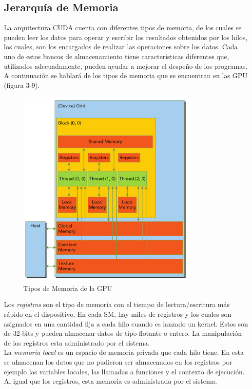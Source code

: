 \subsection{Jerarquía de Memoria}
La arquitectura CUDA cuenta con diferentes tipos de memoria, de los cuales se pueden leer los datos para operar y escribir los resultados obtenidos por los hilos, los cuales, son los encargados de realizar las operaciones sobre los datos. Cada uno de estos bancos de almacenamiento tiene características diferentes que, utilizados adecuadamente, pueden ayudar a mejorar el despeño de los programas. A continuación se hablará de los tipos de memoria que se encuentran en las GPU (figura 3-9).\\
\begin{figure}[H]
                      \centering
                              \includegraphics[height=10cm]{img/memoria.jpg}
                      \caption{Tipos de Memoria de la GPU \cite{chengl} }
\end{figure}
Los \textit{registros} son el tipo de memoria con el tiempo de lectura/escritura más rápido en el dispositivo. En cada SM, hay miles de registros y los cuales son asignados en una cantidad fija a cada hilo cuando es lanzado un kernel. Estos son de 32-bits y pueden almacenar datos de tipo flotante o entero. La manipulación de los registros esta administrado por el sistema.\\
La \textit{memoria local} es un espacio de memoria privada que cada hilo tiene. En esta se almacenan los datos que no pudieron ser almacenados en los registros por ejemplo las variables locales, las llamadas a funciones y el contexto de ejecución. Al igual que los registros, esta memoria es administrada por el sistema.\\
